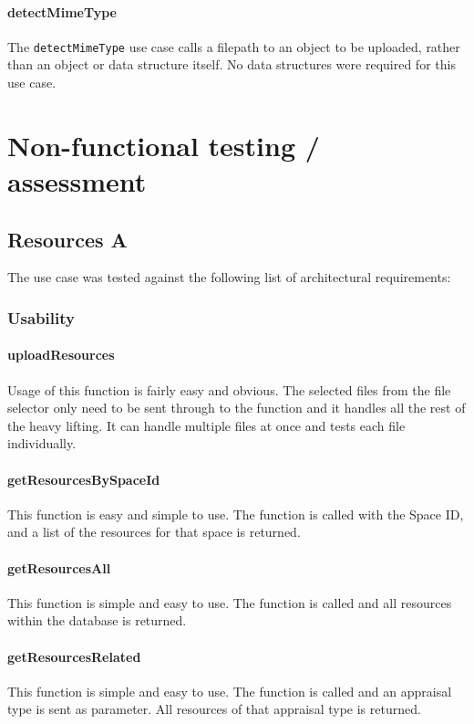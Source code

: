 \documentclass[a4paper]{article}
\begin{document}
\paragraph{detectMimeType}

The \texttt{detectMimeType} use case calls a filepath to an object to be uploaded, rather than an object or data structure itself. No data structures were required for this use case.

\section {Non-functional testing / assessment}
\subsection {Resources A}
The use case was tested against the following list of architectural requirements:
\subsubsection {Usability}

\paragraph{uploadResources}
Usage of this function is fairly easy and obvious. The selected files from the file selector only need to be sent through to the function and it handles all the rest of the heavy lifting. It can handle multiple files at once and tests each file individually.

\paragraph{getResourcesBySpaceId}
This function is easy and simple to use. The function is called with the Space ID, and a list of the resources for that space is returned.

\paragraph{getResourcesAll}
This function is simple and easy to use. The function is called and all resources within the database is returned.

\paragraph{getResourcesRelated}
This function is simple and easy to use. The function is called and an appraisal type is sent as parameter. All resources of that appraisal type is returned.
\end{document}
